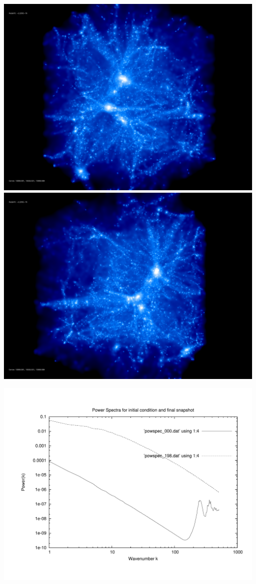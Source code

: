 \includegraphics[scale=0.1]{stages14_ling/rotate_00074.jpg} 
\includegraphics[scale=0.1]{stages14_ling/rotate_00131.jpg}

\includegraphics[scale=0.5]{stages14_ling/plot_powspec_stages14_ling}

